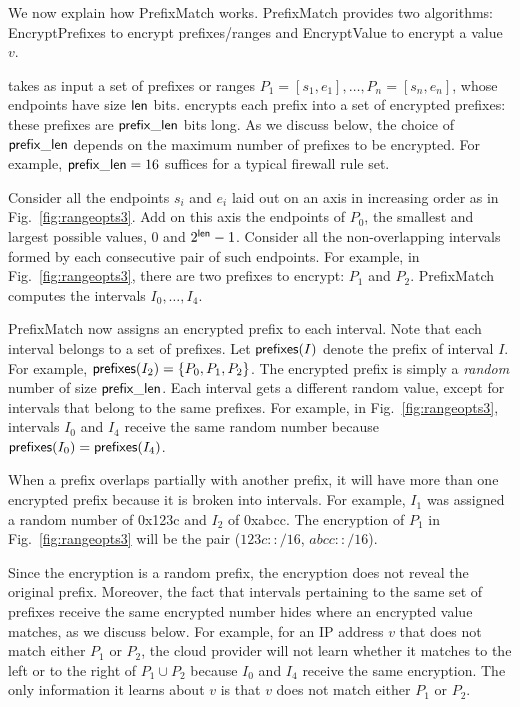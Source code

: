 We now explain how PrefixMatch works.  PrefixMatch provides two algorithms: EncryptPrefixes to encrypt prefixes/ranges and EncryptValue to encrypt a value $v$.



 \pmatch{} takes as input a set of prefixes or ranges $P_1 = [s_1, e_1], \dots, P_n=[s_n, e_n]$, 
whose endpoints have size $\mathsf{len}$ bits. \pmatch{} encrypts each prefix  into a set of encrypted prefixes: these prefixes are $\mathsf{prefix\_len}$ bits long. As we discuss below, the choice of $\mathsf{prefix\_len}$ depends on the maximum number of prefixes to be encrypted. For example,  $\mathsf{prefix\_len} = 16$ suffices for a typical firewall rule set.

Consider all the endpoints $s_i$ and $e_i$ laid out on an axis in increasing order as in Fig.~\ref{fig:rangeopts3}.
Add on this axis the endpoints of $P_0$, the smallest and largest possible values, $0$ and $2^{\mathsf{len}}-1$.
Consider all the non-overlapping intervals formed by each consecutive pair of such endpoints. 
For example, in Fig.~\ref{fig:rangeopts3},  there are two prefixes to encrypt: $P_1$ and $P_2$. PrefixMatch computes the intervals $I_0, \dots, I_4$.

PrefixMatch now assigns an encrypted prefix to each interval. Note that each interval belongs to a set of prefixes. Let $\mathsf{prefixes}(I)$ denote the prefix of interval $I$. For example, $\mathsf{prefixes}(I_2) = \{P_0, P_1, P_2\}$. The encrypted prefix is simply a {\em random} number of size $\mathsf{prefix\_len}$. Each interval gets a different random value, except for intervals that belong to the same prefixes. For example, in Fig.~\ref{fig:rangeopts3}, intervals $I_0$ and $I_4$ receive the same random number because $\mathsf{prefixes}(I_0) = \mathsf{prefixes}(I_4)$.

When a prefix overlaps partially with another prefix, it will have more than one encrypted prefix because it is broken into intervals. For example, $I_1$ was assigned a random number of 0x123c and $I_2$ of 0xabcc. The encryption of  $P_1$ in Fig.~\ref{fig:rangeopts3} will be the pair ($123c::/16$, $abcc::/16$).

Since the encryption is a random prefix, the encryption does not reveal the original prefix. Moreover, the fact that intervals pertaining to the same set of prefixes receive the same encrypted number hides where an encrypted value matches, as we discuss below. For example, for an IP address $v$ that does not match either $P_1$ or $P_2$, the cloud provider will not learn whether it matches to the left or to the right of $P_1 \cup P_2$ because $I_0$ and $I_4$ receive the same encryption. The only information it learns about $v$ is that $v$ does not match either $P_1$ or $P_2$. 

